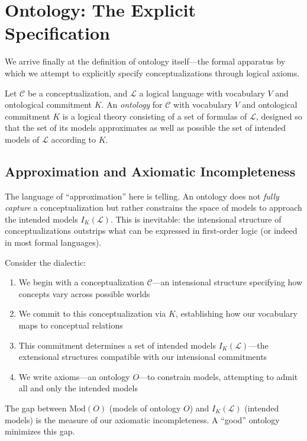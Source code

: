 \section{Ontology: The Explicit Specification}

We arrive finally at the definition of ontology itself—the formal apparatus by which we attempt to explicitly specify conceptualizations through logical axioms.

\begin{definition}[Ontology]
	Let $\mathcal{C}$ be a conceptualization, and $\mathcal{L}$ a logical language with vocabulary $V$ and ontological commitment $K$. An \emph{ontology} for $\mathcal{C}$ with vocabulary $V$ and ontological commitment $K$ is a logical theory consisting of a set of formulas of $\mathcal{L}$, designed so that the set of its models approximates as well as possible the set of intended models of $\mathcal{L}$ according to $K$.
\end{definition}

\subsection{Approximation and Axiomatic Incompleteness}

The language of ``approximation'' here is telling. An ontology does not \emph{fully capture} a conceptualization but rather constrains the space of models to approach the intended models $I_K(\mathcal{L})$. This is inevitable: the intensional structure of conceptualizations outstrips what can be expressed in first-order logic (or indeed in most formal languages).

Consider the dialectic:
\begin{enumerate}
	\item We begin with a conceptualization $\mathcal{C}$—an intensional structure specifying how concepts vary across possible worlds
	\item We commit to this conceptualization via $K$, establishing how our vocabulary maps to conceptual relations
	\item This commitment determines a set of intended models $I_K(\mathcal{L})$—the extensional structures compatible with our intensional commitments
	\item We write axioms—an ontology $O$—to constrain models, attempting to admit all and only the intended models
\end{enumerate}

The gap between $\text{Mod}(O)$ (models of ontology $O$) and $I_K(\mathcal{L})$ (intended models) is the measure of our axiomatic incompleteness. A ``good'' ontology minimizes this gap.


